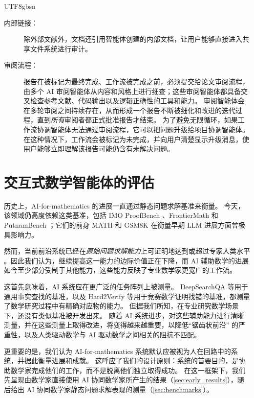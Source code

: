 \documentclass[11pt, a4paper, copyright, gdm]{google}
\begin{document}
\begin{CJK*}{UTF8}{gbsn}
\begin{description}
\item[内部链接：] 除外部文献外，文档还引用智能体创建的内部文档，让用户能够直接进入共享文件系统进行审计。

\item[审阅流程：] 报告在被标记为最终完成、工作流被完成之前，必须提交给论文审阅流程，由多个 AI 审阅智能体从内容和风格上进行细查；这些审阅智能体都具备交叉检查参考文献、代码输出以及逻辑正确性的工具和能力。
审阅智能体会在多轮审阅之间持续存在，从而形成一个报告不断被细化和改进的迭代过程，直到\textit{所有}审阅者都正式批准报告才结束。
为了避免无限循环，如果工作流协调智能体无法通过审阅流程，它可以把问题升级给项目协调智能体。
在这种情况下，工作流会被标记为未完成，并向用户清楚显示升级消息，使用户能够立即理解该报告可能仍含有未解决问题。
\end{description}

\section{交互式数学智能体的评估}
\label{sec:evaluation_paradigm}

历史上，AI-for-mathematics 的进展一直通过静态问题求解基准来衡量。
今天，该领域仍高度依赖这类基准，包括 IMO ProofBench \citep{luong2025imobench}、FrontierMath \citep{glazer2024} 和 PutnamBench \citep{tsou2024putnambench}；它们的前身 MATH \citep{hendrycks2021math} 和 GSM8K \citep{cobbe2021gsm8k} 在衡量早期 LLM 进展方面曾极具影响力。

然而，当前前沿系统已经在\textit{原始问题求解能力}上可证明地达到或超过专家人类水平 \citep[e.g.,][]{luong2025advanced, abouzaid2026proof}。因此我们认为，继续提高这一能力的边际价值正在下降，而 AI 辅助数学的进展如今至少部分受制于其他能力，这些能力反映了专业数学家更宽广的工作流。

这首先意味着，AI 系统应在更广泛的任务阵列上被测量。
DeepSearchQA \citep{gupta2026} 等用于通用事实查找的基准，以及 Hard2Verify \citep{pandit2025} 等用于竞赛数学证明找错的基准，都测量了数学研究过程中有精确对应物的能力。
但据我们所知，在专业研究数学场景下，还没有类似基准被开发出来。
随着 AI 系统进步，对这些辅助能力进行清晰测量，并在这些测量上取得改进，将变得越来越重要，以降低“锯齿状前沿” \citep{dellacqua2026navigating} 的严重性，以及人类驱动数学与 AI 驱动数学之间相关的阻抗不匹配。

更重要的是，我们认为 AI-for-mathematics 系统默认应被视为人在回路中的系统，并据此衡量进展和成就。
这呼应了我们的设计原则：系统的首要目的，是协助数学家完成他们的工作，而不是脱离他们独立取得成功。
在这一框架下，我们先呈现由数学家直接使用 AI 协同数学家所产生的结果（\cref{sec:early_results}），随后给出 AI 协同数学家静态问题求解表现的测量（\cref{sec:benchmarks}）。


\end{CJK*}
\end{document}
